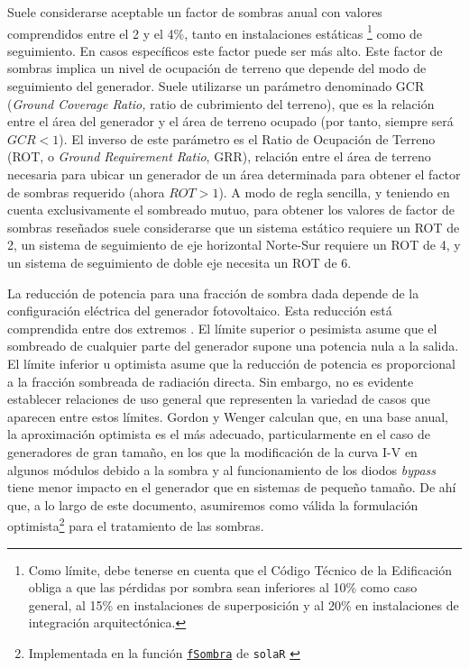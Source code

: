 Suele considerarse aceptable un factor de sombras anual con valores
comprendidos entre el 2 y el 4\%, tanto en instalaciones estáticas%
\footnote{Como límite, debe tenerse en cuenta que el Código Técnico de la Edificación
\cite{CTE2017} obliga a que las pérdidas por sombra sean
inferiores al 10\% como caso general, al 15\% en instalaciones de
superposición y al 20\% en instalaciones de integración arquitectónica.%
} como de seguimiento. En casos específicos este factor puede ser más
alto. Este factor de sombras implica un nivel de ocupación de terreno
que depende del modo de seguimiento del generador. Suele utilizarse
un parámetro denominado GCR (\emph{Ground Coverage Ratio,} ratio de
cubrimiento del terreno), que es la relación entre el área del generador
y el área de terreno ocupado (por tanto, siempre será $GCR<1$). El
inverso de este parámetro es el Ratio de Ocupación de Terreno (ROT, o
\emph{Ground Requirement Ratio}, GRR),
relación entre el área de terreno necesaria para ubicar un generador
de un área determinada para obtener el factor de sombras requerido
(ahora $ROT>1$).
A modo de regla sencilla, y teniendo en cuenta exclusivamente el sombreado
mutuo, para obtener los valores de factor de sombras reseñados suele
considerarse que un sistema estático requiere un ROT de 2, un sistema
de seguimiento de eje horizontal Norte-Sur requiere un ROT de 4, y
un sistema de seguimiento de doble eje necesita un ROT de 6.

La reducción de potencia para una fracción de sombra dada depende de
la configuración eléctrica del generador fotovoltaico. Esta reducción
está comprendida entre dos extremos \cite{Gordon.Wenger1991}. 
El límite superior o pesimista asume que el sombreado de cualquier
parte del generador supone una potencia nula a la salida.
El límite inferior u optimista asume que la reducción de potencia es
proporcional a la fracción sombreada de radiación directa. 
Sin embargo, no es evidente establecer relaciones de uso general que representen 
la variedad de casos que aparecen entre estos límites. 
Gordon y Wenger \cite{Gordon.Wenger1991} calculan que, en una base anual,
la aproximación optimista es el más adecuado, particularmente en el
caso de generadores de gran tamaño, en los que la modificación de la
curva I-V en algunos módulos debido a la sombra y al funcionamiento de
los diodos \emph{bypass} tiene menor impacto en el generador que en
sistemas de pequeño tamaño. De ahí que, a lo largo de este documento,
asumiremos como válida la formulación optimista\footnote{Implementada
  en la función
  \href{http://search.r-project.org/R/library/solaR/html/fSombra.html}{\texttt{fSombra}}
  de \texttt{solaR} \cite{Perpinan2012b}} para el tratamiento de
las sombras.


